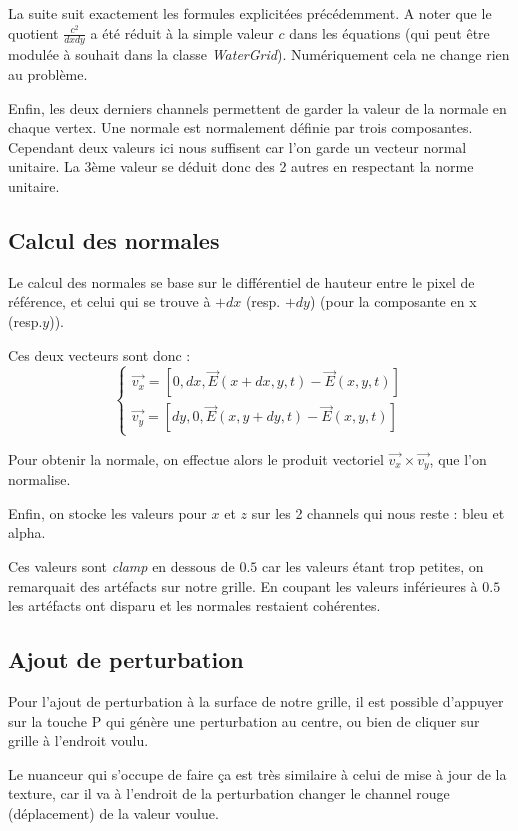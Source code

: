 \documentclass[a4paper,11pt,leqno]{article}
\begin{document}
La suite suit exactement les formules explicitées précédemment. A noter que le quotient $\frac{c^2}{dx dy}$ a été réduit à la simple valeur $c$ dans les équations (qui peut être modulée à souhait dans la classe \emph{WaterGrid}). Numériquement cela ne change rien au problème.

Enfin, les deux derniers channels permettent de garder la valeur de la normale en chaque vertex. Une normale est normalement définie par trois composantes. Cependant deux valeurs ici nous suffisent car l'on garde un vecteur normal unitaire. La 3ème valeur se déduit donc des 2 autres en respectant la norme unitaire.

\subsection{Calcul des normales}

Le calcul des normales se base sur le différentiel de hauteur entre le pixel de référence, et celui qui se trouve à $+dx$ (resp. $+dy$) (pour la composante en x (resp.$y$)).

Ces deux vecteurs sont donc :
\[
\begin{cases}
\overrightarrow{v_x} = [0, dx, \overrightarrow{E}(x + dx,y,t) - \overrightarrow{E}(x,y,t)] \\
\overrightarrow{v_y} = [dy, 0, \overrightarrow{E}(x,y + dy,t) - \overrightarrow{E}(x,y,t)]
\end{cases}
\]

Pour obtenir la normale, on effectue alors le produit vectoriel $\overrightarrow{v_x} \times \overrightarrow{v_y}$, que l'on normalise.

Enfin, on stocke les valeurs pour $x$ et $z$ sur les 2 channels qui nous reste : bleu et alpha.

Ces valeurs sont \emph{clamp} en dessous de $0.5$ car les valeurs étant trop petites, on remarquait des artéfacts sur notre grille. En coupant les valeurs inférieures à $0.5$ les artéfacts ont disparu et les normales restaient cohérentes.

\subsection{Ajout de perturbation}

Pour l'ajout de perturbation à la surface de notre grille, il est possible d'appuyer sur la touche P qui génère une perturbation au centre, ou bien de cliquer sur grille à l'endroit voulu.

Le nuanceur qui s'occupe de faire ça est très similaire à celui de mise à jour de la texture, car il va à l'endroit de la perturbation changer le channel rouge (déplacement) de la valeur voulue.
\end{document}
